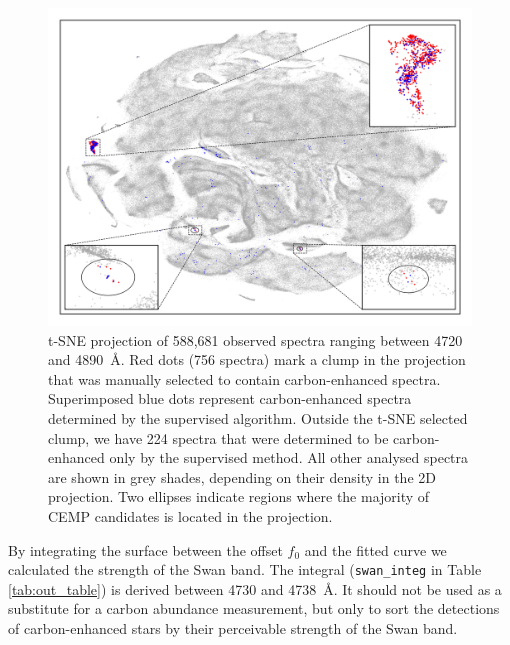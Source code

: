 \begin{figure}
	\centering
	\includegraphics[width=\textwidth]{tsne_circles.png}
	\caption{t-SNE projection of 588,681 observed spectra ranging between 4720 and 4890~\AA. Red dots (756 spectra) mark a clump in the projection that was manually selected to contain carbon-enhanced spectra. Superimposed blue dots represent carbon-enhanced spectra determined by the supervised algorithm. Outside the t-SNE selected clump, we have 224 spectra that were determined to be carbon-enhanced only by the supervised method. All other analysed spectra are shown in grey shades, depending on their density in the 2D projection. Two ellipses indicate regions where the majority of CEMP candidates is located in the projection.}
	\label{fig:tsne_plot}
\end{figure}

By integrating the surface between the offset $f_0$ and the fitted curve we calculated the strength of the Swan band. The integral (\texttt{swan\_integ} in Table \ref{tab:out_table}) is derived between 4730 and 4738~\AA. It should not be used as a substitute for a carbon abundance measurement, but only to sort the detections of carbon-enhanced stars by their perceivable strength of the Swan band.

